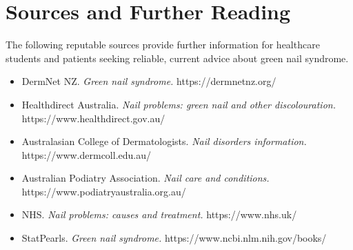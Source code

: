 \section*{Sources and Further Reading}
The following reputable sources provide further information for healthcare students and patients seeking reliable, current advice about green nail syndrome.

\begin{itemize}
    \item DermNet NZ. \textit{Green nail syndrome.} https://dermnetnz.org/
    \item Healthdirect Australia. \textit{Nail problems: green nail and other discolouration.} https://www.healthdirect.gov.au/
    \item Australasian College of Dermatologists. \textit{Nail disorders information.} https://www.dermcoll.edu.au/
    \item Australian Podiatry Association. \textit{Nail care and conditions.} https://www.podiatryaustralia.org.au/
    \item NHS. \textit{Nail problems: causes and treatment.} https://www.nhs.uk/
    \item StatPearls. \textit{Green nail syndrome.} https://www.ncbi.nlm.nih.gov/books/
\end{itemize}
